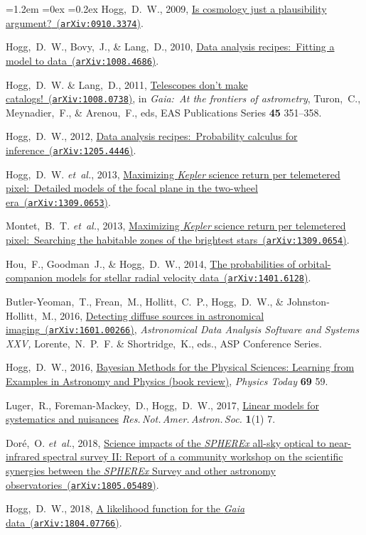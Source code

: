 \documentclass[10pt,letterpaper]{article}
\newcommand{\foreign}[1]{\textsl{#1}}
\newcommand{\etal}{\foreign{et~al.}}
\newcommand{\project}[1]{\textsl{#1}}
\newcommand{\doi}[2]{\href{http://dx.doi.org/#1}{{#2}}}
\newcommand{\arxiv}[2]{\href{http://arxiv.org/abs/#1}{{#2}\ (\texttt{arXiv:#1})}}
\newcounter{refpubnum}
\newcommand{\hogglist}{%
    \rightmargin=0in
    \leftmargin=1.2em
    \topsep=0ex
    \partopsep=0pt
    \itemsep=0.2ex
    \parsep=0pt
    \itemindent=-1.0\leftmargin
    \listparindent=0.0\leftmargin
    \settowidth{\labelsep}{~}
    \usecounter{refpubnum}
  }
\begin{document}
\begin{list}{}{\hogglist}
Hogg,~D.~W., 2009,
\arxiv{0910.3374}{Is cosmology just a plausibility argument?}.
\item
Hogg,~D.~W., Bovy,~J., \& Lang,~D., 2010,
\arxiv{1008.4686}{Data analysis recipes:\ Fitting a model to data}.
\item
Hogg,~D.~W. \& Lang,~D., 2011,
\arxiv{1008.0738}{Telescopes don't make catalogs!},
in \textit{Gaia:\ At the frontiers of astrometry}, Turon,~C., Meynadier,~F., \& Arenou,~F., eds,
EAS Publications Series \textbf{45} 351--358.
\item
Hogg,~D.~W., 2012,
\arxiv{1205.4446}{Data analysis recipes:\ Probability calculus for inference}.
\item
Hogg,~D.~W. \etal, 2013,
\arxiv{1309.0653}{Maximizing \project{Kepler} science return per telemetered pixel:\ Detailed models of the focal plane in the two-wheel era}.
\item
Montet,~B.~T. \etal, 2013,
\arxiv{1309.0654}{Maximizing \project{Kepler} science return per telemetered pixel:\ Searching the habitable zones of the brightest stars}.
\item
Hou,~F., Goodman~J., \& Hogg,~D.~W., 2014,
\arxiv{1401.6128}{The probabilities of orbital-companion models for stellar radial velocity data}.
\item
Butler-Yeoman,~T., Frean,~M., Hollitt,~C.~P., Hogg,~D.~W., \& Johnston-Hollitt,~M., 2016,
\arxiv{1601.00266}{Detecting diffuse sources in astronomical imaging},
\textit{Astronomical Data Analysis Software and Systems XXV,} 
Lorente,~N.~P.~F. \& Shortridge,~K., eds., 
ASP Conference Series. %
\item
Hogg,~D.~W., 2016,
\doi{10.1063/PT.3.3200}{Bayesian Methods for the Physical Sciences: Learning from Examples in Astronomy and Physics (book review)},
\textit{Physics Today} \textbf{69} 59.
\item
Luger,~R., Foreman-Mackey,~D., Hogg,~D.~W., 2017,
\doi{10.3847/2515-5172/aa96b5}{Linear models for systematics and nuisances}
\textit{Res.\,Not.\,Amer.\,Astron.\,Soc.} \textbf{1}(1) 7.
\item
Dor\'e,~O. \etal, 2018,
\arxiv{1805.05489}{Science impacts of the \project{SPHEREx} all-sky optical to near-infrared spectral survey II: Report of a community workshop on the scientific synergies between the \project{SPHEREx} Survey and other astronomy observatories}.
\item
Hogg,~D.~W., 2018,
\arxiv{1804.07766}{A likelihood function for the \project{Gaia} data}.
\item

\end{list}
\end{document}
